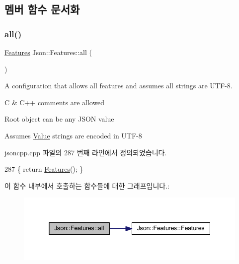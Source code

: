 \subsection{멤버 함수 문서화}
\mbox{\label{class_json_1_1_features_a63894da6e2c100b38741fa933f3d33ae}} 
\subsubsection{\texorpdfstring{all()}{all()}}
{\footnotesize\ttfamily \hyperlink{class_json_1_1_features}{Features} Json\+::\+Features\+::all (\begin{DoxyParamCaption}{ }\end{DoxyParamCaption})\hspace{0.3cm}{\ttfamily [static]}}



A configuration that allows all features and assumes all strings are U\+T\+F-\/8. 


\begin{DoxyItemize}
\item C \& C++ comments are allowed
\item Root object can be any J\+S\+ON value
\item Assumes \hyperlink{class_json_1_1_value}{Value} strings are encoded in U\+T\+F-\/8 
\end{DoxyItemize}

jsoncpp.\+cpp 파일의 287 번째 라인에서 정의되었습니다.


\begin{DoxyCode}
287 \{ \textcolor{keywordflow}{return} \hyperlink{class_json_1_1_features_ad15a091cb61bb31323299a95970d2644}{Features}(); \}
\end{DoxyCode}
이 함수 내부에서 호출하는 함수들에 대한 그래프입니다.\+:
\nopagebreak
\begin{figure}[H]
\begin{center}
\leavevmode
\includegraphics[width=338pt]{class_json_1_1_features_a63894da6e2c100b38741fa933f3d33ae_cgraph}
\end{center}
\end{figure}
\mbox{\label{class_json_1_1_features_ae23176c14b2e79e81fb61fb1a8ab58ee}} 
